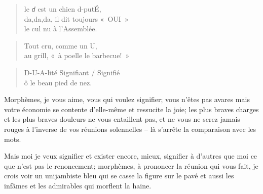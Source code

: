   \begin{center}
  \end{center}
  \begin{verse}
    le \emph{\texttt{d}} est un chien d-put{\Large \'{E}},\\
    da,da,da, il dit toujours «~OUI~»\\
    le cul nu à l’Assemblée.
  \end{verse}
  \begin{center}

  \end{center}
  \begin{verse}
    Tout cru, comme un {\Huge U},\\
    au grill, «~à poelle le barbecue!~»
  \end{verse}
  \begin{verse}
    D-U-A-lité Signifiant / Signifié\\
    ô le beau pied de nez.
  \end{verse}
  Morphèmes, je vous aime, vous qui voulez signifier; vous n’êtes pas avares mais
  votre économie se contente d’elle-même et ressucite la joie; les plus braves
  charges et les plus braves douleurs ne vous entaillent pas, et ne vous ne serez
  jamais rouges à l’inverse de vos réunions solennelles -- là s’arrête la comparaison
  avec les mots.

  Mais moi je veux signifier et exister encore, mieux, signifier à d’autres que moi
  ce que n’est pas le renoncement; morphèmes, à prononcer la réunion qui vous fait,
  je crois voir un unijambiste bleu qui se casse la figure sur le pavé et aussi les
  infâmes et les admirables qui morflent la haine.

